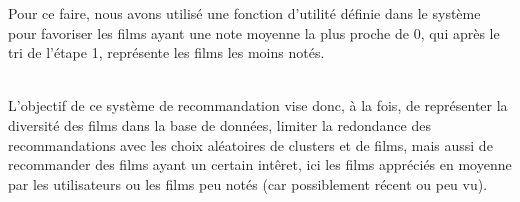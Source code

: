 \documentclass{article}
\begin{document}
\begin{itemize}
\begin{enumerate}
                    Pour ce faire, nous avons utilisé une fonction d'utilité définie dans le système pour favoriser les films ayant une note moyenne la plus proche de 0, qui après le tri de l'étape 1, représente les films les moins notés.
          \end{enumerate}
          $ $\\
          L'objectif de ce système de recommandation vise donc, à la fois, de représenter la diversité des films dans la base de données, limiter la redondance des recommandations avec les choix aléatoires de clusters et de films, mais aussi de recommander des films
          ayant un certain intêret, ici les films appréciés en moyenne par les utilisateurs ou les films peu notés (car possiblement récent ou peu vu).\\
\end{itemize}
\end{document}
